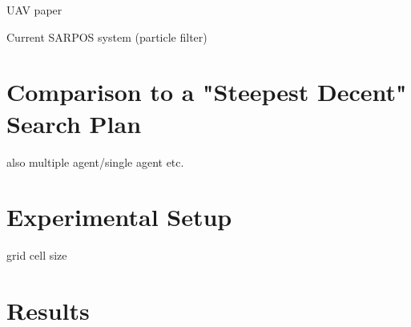 \documentclass[12pt, letterpaper]{article}  %
\theoremstyle{definition}
\theoremstyle{remark}
\newtheorem{lem}[thm]{Lemma}
\theoremstyle{plain}
\begin{document}



UAV paper

Current SARPOS system (particle filter)


\section{Comparison to a "Steepest Decent" Search Plan}\label{sec:greedyalg}




also multiple agent/single agent etc.





\section{Experimental Setup}\label{sec:experiment}

grid cell size



\section{Results}\label{sec:results}
\end{document}
